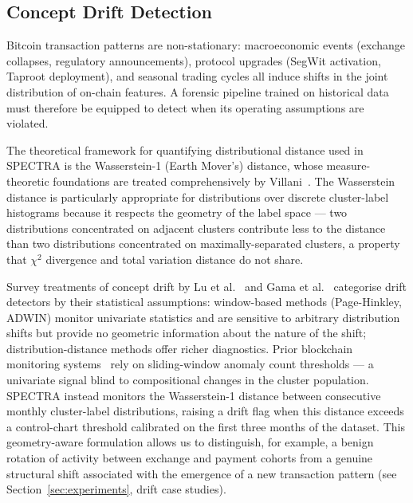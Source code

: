 \subsection{Concept Drift Detection}
\label{subsec:drift}

Bitcoin transaction patterns are non-stationary: macroeconomic events
(exchange collapses, regulatory announcements), protocol upgrades (SegWit
activation, Taproot deployment), and seasonal trading cycles all induce shifts
in the joint distribution of on-chain features.  A forensic pipeline trained on
historical data must therefore be equipped to detect when its operating
assumptions are violated.

The theoretical framework for quantifying distributional distance used in
SPECTRA is the Wasserstein-1 (Earth Mover's) distance, whose measure-theoretic
foundations are treated comprehensively by Villani~\cite{Villani2009}.  The
Wasserstein distance is particularly appropriate for distributions over discrete
cluster-label histograms because it respects the geometry of the label space
--- two distributions concentrated on adjacent clusters contribute less to the
distance than two distributions concentrated on maximally-separated clusters,
a property that $\chi^2$ divergence and total variation distance do not share.

Survey treatments of concept drift by Lu et al.~\cite{Lu2018} and Gama et
al.~\cite{Gama2014} categorise drift detectors by their statistical assumptions:
window-based methods (Page-Hinkley, ADWIN) monitor univariate statistics and
are sensitive to arbitrary distribution shifts but provide no geometric
information about the nature of the shift; distribution-distance methods
offer richer diagnostics.  Prior blockchain monitoring
systems~\cite{Chainalysis2023} rely on sliding-window anomaly count thresholds
--- a univariate signal blind to compositional changes in the cluster
population.  SPECTRA instead monitors the Wasserstein-1 distance between
consecutive monthly cluster-label distributions, raising a drift flag when this
distance exceeds a control-chart threshold calibrated on the first three months
of the dataset.  This geometry-aware formulation allows us to distinguish, for
example, a benign rotation of activity between exchange and payment cohorts from
a genuine structural shift associated with the emergence of a new transaction
pattern (see Section~\ref{sec:experiments}, drift case studies).

